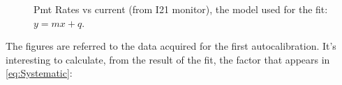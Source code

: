 \begin{figure}[hbtp]
\centering
{}
\caption{Pmt Rates vs current (from I21 monitor), the model used for the fit: $y = mx + q$.}
\end{figure}

\newpage
The figures are referred to the data acquired for the first autocalibration. It's interesting to calculate, from the result of the fit, the factor that appears in \ref{eq:Systematic}:

